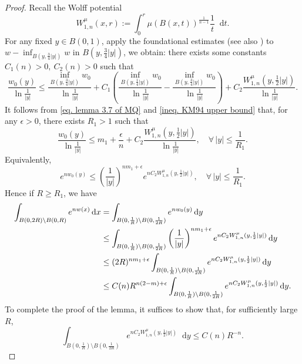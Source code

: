 \documentclass[10pt,a4paper]{amsart}
\numberwithin{equation}{section}
\newcommand{\dd}{\mathop{}\!\mathrm{d}}%
\newcommand{\dx}{\mathop{}\!\mathrm{d}x}
\newcommand{\dy}{\mathop{}\!\mathrm{d}y}
\begin{document}
\begin{proof}
    Recall the Wolff potential
    \[
        W_{1,n}^{\mu}(x,r):=\int_0^r \mu(B(x,t))^{\frac{1}{n-1}}\frac{1}{t}\dd t.
    \]
    For any fixed $y\in B(0,1)$,  apply the foundational estimates \cite[Theorem 1.6]{KM94} (see also \cite[Theorem 2.6]{MQ}) to $w-\inf_{B(y,\frac{3}{4}|y|)}w$ in $B(y,\frac{3}{4}|y|)$, we obtain: there exists some constants $C_1(n)>0,\ C_2(n)>0$ such that
    \begin{equation}\label{ineq. KM94 upper bound}
        \frac{w_0(y)}{\ln\frac{1}{|y|}}\leq
        \frac{\inf_{B(y,\frac{3}{4}|y|)}w_0}{\ln\frac{1}{|y|}}
        +C_1 \left(
        \frac{\inf_{B(y,\frac{1}{4}|y|)}w_0}{\ln\frac{1}{|y|}}
        -\frac{\inf_{B(y,\frac{3}{4}|y|)}w_0}{\ln\frac{1}{|y|}}
        \right)
        +C_2\frac{W_{1,n}^{\mu}(y,\frac{1}{2}|y|)}{\ln\frac{1}{|y|}}.
    \end{equation}
    It follows from \cref{eq. lemma 3.7 of MQ} and \cref{ineq. KM94 upper bound} that, for any $\epsilon>0$, there exists $R_1>1$ such that
    \[
        \frac{w_0(y)}{\ln\frac{1}{|y|}}\leq
        m_1+\frac{\epsilon}{n}+C_2\frac{W_{1,n}^{\mu}(y,\frac{1}{2}|y|)}{\ln\frac{1}{|y|}},
        \quad \forall\, |y|\leq \frac{1}{R_1}.
    \]
    Equivalently,
    \[
        e^{nw_0(y)}\leq 
        \left(\frac{1}{|y|}\right)^{nm_1+\epsilon}
        e^{nC_2W_{1,n}^{\mu}(y,\frac{1}{2}|y|)},
        \quad \forall\, |y|\leq \frac{1}{R_1}.
    \]
Hence if $R\geq R_1$, we have
    \begin{align} \notag
        \int_{B(0,2R)\setminus B(0,R)}e^{nw(x)}\dx
        &=\int_{B(0,\frac{1}{R})\setminus B(0,\frac{1}{2R})}e^{nw_0(y)}\dy \\ \notag
        &\leq \int_{B(0,\frac{1}{R})\setminus B(0,\frac{1}{2R})}\left(\frac{1}{|y|}\right)^{nm_1+\epsilon}
        e^{nC_2W_{1,n}^{\mu}(y,\frac{1}{2}|y|)}\dy \notag\\
        &\leq (2R)^{nm_1+\epsilon}
        \int_{B(0,\frac{1}{R})\setminus B(0,\frac{1}{2R})} e^{nC_2W_{1,n}^{\mu}(y,\frac{1}{2}|y|)}\dy\notag\\
        &\leq C(n)R^{n(2-m)+\epsilon}\int_{B(0,\frac{1}{R})\setminus B(0,\frac{1}{2R})} e^{nC_2W_{1,n}^{\mu}(y,\frac{1}{2}|y|)}\dy. \label{ineq. integral of exp(n phi)}
    \end{align}
    To complete the proof of the lemma, it suffices to show that, for sufficiently large $R$,
    \begin{equation}\label{ineq. integral of Wolff potential}
        \int_{B(0,\frac{1}{R})\setminus B(0,\frac{1}{2R})} e^{nC_2W_{1,n}^{\mu}(y,\frac{1}{2}|y|)}\dy
        \leq C(n) R^{-n}.
    \end{equation}
    

\end{proof}
\end{document}

